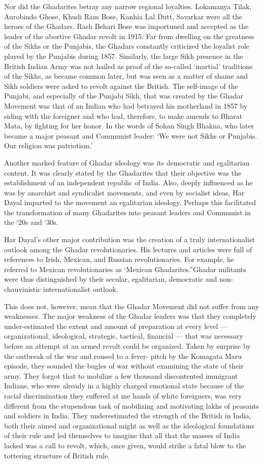 Nor did the Ghadarites betray any narrow regional loyalties. Lokamanya Tilak, Aurobindo Ghose, Khudi Ram Bose, Kanhia Lal Dutt, Savarkar were all the heroes of the Ghadars. Rash Behari Bose was importuned and accepted as the leader of the abortive Ghadar revolt in 1915. Far from dwelling on the greatness of the Sikhs or the Punjabis, the Ghadars constantly criticized the loyalist role played by the Punjabis during 1857. Similarly, the large Sikh presence in the British Indian Army was not hailed as proof of the so-called ‘martial’ traditions of the Sikhs, as became common later, but was seen as a matter of shame and Sikh soldiers were asked to revolt against the British. The self-image of the Punjabi, and especially of the Punjabi Sikh, that was created by the Ghadar Movement was that of an Indian who had betrayed his motherland in 1857 by siding with the foreigner and who had, therefore, to make amends to Bharat Mata, by fighting for her honor. In the words of Sohan Singh Bhakna, who later became a major peasant and Communist leader: ‘We were not Sikhs or Punjabis. Our religion was patriotism.’

Another marked feature of Ghadar ideology was its democratic and egalitarian content. It was clearly stated by the Ghadarites that their objective was the establishment of an independent republic of India. Also, deeply influenced as he was by anarchist and syndicalist movements, and even by socialist ideas, Har Dayal imparted to the movement an egalitarian ideology. Perhaps this facilitated the transformation of many Ghadarites into peasant leaders and Communist in the ‘20s and ‘30s.

Har Dayal’s other major contribution was the creation of a truly internationalist outlook among the Ghadar revolutionaries. His lectures and articles were full of references to Irish, Mexican, and Russian revolutionaries. For example, he referred to Mexican revolutionaries as ‘Mexican Ghadarites.”Ghadar militants were thus distinguished by their secular, egalitarian, democratic and non-chauvinistic internationalist outlook.

This does not, however, mean that the Ghadar Movement did not suffer from any weaknesses. The major weakness of the Ghadar leaders was that they completely under-estimated the extent and amount of preparation at every level — organizational, ideological, strategic, tactical, financial — that was necessary before an attempt at an armed revolt could be organized. Taken by surprise by the outbreak of the war and roused to a fever- pitch by the Komagata Maru episode, they sounded the bugles of war without examining the state of their army. They forgot that to mobilize a few thousand discontented immigrant Indians, who were already in a highly charged emotional state because of the racial discrimination they suffered at me hands of white foreigners, was very different from the stupendous task of mobilizing and motivating lakhs of peasants and soldiers in India. They underestimated the strength of the British in India, both their aimed and organizational might as well as the ideological foundations of their rule and led themselves to imagine that all that the masses of India lacked was a call to revolt, which, once given, would strike a fatal blow to the tottering structure of British rule.

